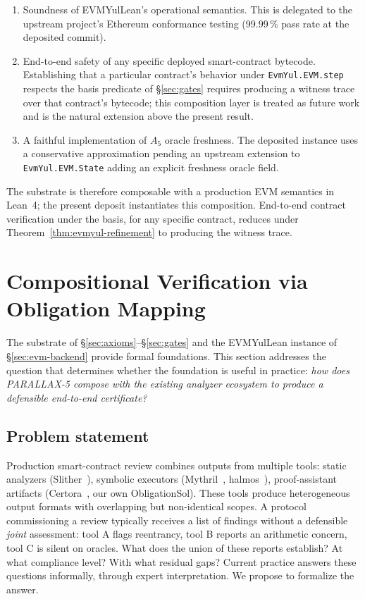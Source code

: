 \documentclass[11pt,a4paper]{article}
\begin{document}
\begin{enumerate}
\item Soundness of EVMYulLean's operational semantics. This is delegated to the upstream project's Ethereum conformance testing (99.99\,\% pass rate at the deposited commit).
\item End-to-end safety of any specific deployed smart-contract bytecode. Establishing that a particular contract's behavior under \texttt{EvmYul.EVM.step} respects the basis predicate of \S\ref{sec:gates} requires producing a witness trace over that contract's bytecode; this composition layer is treated as future work and is the natural extension above the present result.
\item A faithful implementation of $A_5$ oracle freshness. The deposited instance uses a conservative approximation pending an upstream extension to \texttt{EvmYul.EVM.State} adding an explicit freshness oracle field.
\end{enumerate}

The substrate is therefore composable with a production EVM semantics in Lean~4; the present deposit instantiates this composition. End-to-end contract verification under the basis, for any specific contract, reduces under Theorem~\ref{thm:evmyul-refinement} to producing the witness trace.

\section{Compositional Verification via Obligation Mapping}\label{sec:compositional-verification}

The substrate of \S\ref{sec:axioms}--\S\ref{sec:gates} and the EVMYulLean instance of \S\ref{sec:evm-backend} provide formal foundations. This section addresses the question that determines whether the foundation is useful in practice: \emph{how does PARALLAX-5 compose with the existing analyzer ecosystem to produce a defensible end-to-end certificate?}

\subsection{Problem statement}

Production smart-contract review combines outputs from multiple tools: static analyzers (Slither~\cite{slither}), symbolic executors (Mythril~\cite{mythril}, halmos~\cite{halmos}), proof-assistant artifacts (Certora~\cite{certora}, our own ObligationSol). These tools produce heterogeneous output formats with overlapping but non-identical scopes. A protocol commissioning a review typically receives a list of findings without a defensible \emph{joint} assessment: tool A flags reentrancy, tool B reports an arithmetic concern, tool C is silent on oracles. What does the union of these reports establish? At what compliance level? With what residual gaps? Current practice answers these questions informally, through expert interpretation. We propose to formalize the answer.
\end{document}

